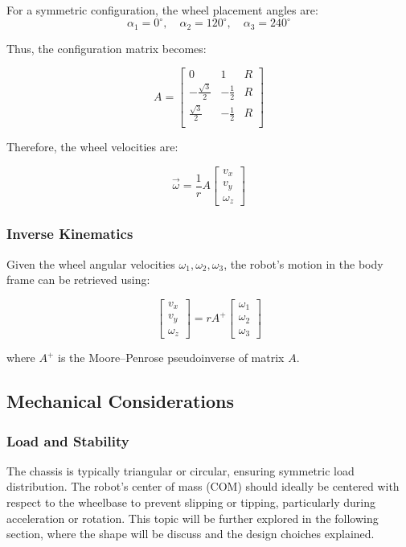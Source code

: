 \documentclass{article}
\begin{document}
For a symmetric configuration, the wheel placement angles are:
\[
\alpha_1 = 0^\circ, \quad \alpha_2 = 120^\circ, \quad \alpha_3 = 240^\circ
\]

Thus, the configuration matrix becomes:

\[
A =
\begin{bmatrix}
0 & 1 & R \\
-\frac{\sqrt{3}}{2} & -\frac{1}{2} & R \\
\frac{\sqrt{3}}{2} & -\frac{1}{2} & R \\
\end{bmatrix}
\]

Therefore, the wheel velocities are:

\[
\vec{\omega} = \frac{1}{r} A
\begin{bmatrix}
v_x \\
v_y \\
\omega_z
\end{bmatrix}
\]

\subsubsection{Inverse Kinematics}

Given the wheel angular velocities $\omega_1, \omega_2, \omega_3$, the robot’s motion in the body frame can be retrieved using:

\[
\begin{bmatrix}
v_x \\
v_y \\
\omega_z
\end{bmatrix}
= r A^+ 
\begin{bmatrix}
\omega_1 \\
\omega_2 \\
\omega_3
\end{bmatrix}
\]

where $A^+$ is the Moore–Penrose pseudoinverse of matrix $A$.

\subsection{Mechanical Considerations}

\subsubsection{Load and Stability}

The chassis is typically triangular or circular, ensuring symmetric load distribution. The robot’s center of mass (COM) should ideally be centered with respect to the wheelbase to prevent slipping or tipping, particularly during acceleration or rotation. This topic will be further explored in the following section, where the shape will be discuss and the design choiches explained.
\end{document}
